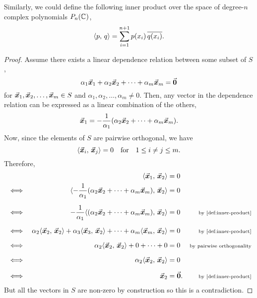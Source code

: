 \documentclass[../MathsNotesBase.tex]{subfiles}
\begin{document}
{\begin{exe}
{				Similarly, we could define the following inner product over the space of degree-$n$ complex polynomials $P_n(\mathbb{C}^{})$,
				\[ \langle p,\, q \rangle = \sum_{i = 1}^{n+1} p(x_i) \, \overline{q(x_i)}. \]
			}
		\end{exe}
	
		\bigskip
		\label{def:orthogonality}
	
		\label{def:orthogonal-complement}
	
		\medskip
		\begin{proof}
			Assume there exists a linear dependence relation between some subset of $S$,
			\[ \alpha_1 \vec{\bm{x}}_1 + \alpha_2 \vec{\bm{x}}_2 + \cdots + \alpha_m \vec{\bm{x}}_m = \vec{\bm{0}} \]
			for ${ \vec{\bm{x}}_1,\vec{\bm{x}}_2,\dots,\vec{\bm{x}}_m \in S }$ and ${ \alpha_1,\alpha_2,\dots,\alpha_m \neq 0 }$. Then, any vector in the dependence relation can be expressed as a linear combination of the others,
			\[ \vec{\bm{x}}_1 = -\frac{1}{\alpha_1}(\alpha_2 \vec{\bm{x}}_2 + \cdots + \alpha_m \vec{\bm{x}}_m). \]
			Now, since the elements of $S$ are pairwise orthogonal, we have
			\[ \langle \vec{\bm{x}}_i,\, \vec{\bm{x}}_j \rangle = 0 \hspace{10pt}\text{for}\hspace{10pt} 1 \leq i \neq j \leq m. \]
			Therefore,
			\[\begin{aligned}
				&& \inner{\x_1}{\x_2} &= 0 \\
				&\iff & \inner{-\frac{1}{\alpha_1}(\alpha_2 \x_2 + \cdots + \alpha_m \x_m)}{\x_2} &= 0 &\sidecomment{} \nn
				&\iff & -\frac{1}{\alpha_1}\inner{(\alpha_2 \x_2 + \cdots + \alpha_m \x_m)}{\x_2} &= 0 &\sidecomment{by \ref{def:inner-product}} \nn
				&\iff & \alpha_2\inner{\x_2}{\x_2} + \alpha_3\inner{\x_3}{\x_2} + \cdots + \alpha_m\inner{\x_m}{\x_2} &= 0 &\sidecomment{by \ref{def:inner-product}} \nn
				&\iff & \alpha_2\inner{\x_2}{\x_2} + 0 + \cdots + 0 &= 0 &\sidecomment{by pairwise orthogonality} \nn
				&\iff & \alpha_2\inner{\x_2}{\x_2} &= 0 \nn
				&\iff & \x_2 &= \0. &\sidecomment{by \ref{def:inner-product}}
			\end{aligned}\]
			But all the vectors in $S$ are non-zero by construction so this is a contradiction.
		\end{proof}	
	
}
\end{document}
